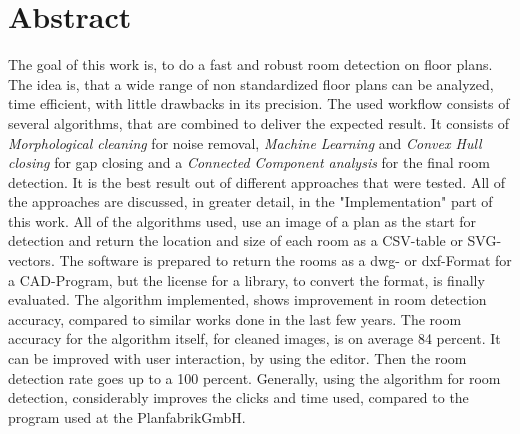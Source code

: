 \section{Abstract}
The goal of this work is, to do a fast and robust room detection on floor plans. The idea is, that a wide range of non standardized floor plans can be analyzed, time efficient, with little drawbacks in its precision.
The used workflow consists of several algorithms, that are combined to deliver the expected result. It consists of \textit{Morphological cleaning} for noise removal, \textit{Machine Learning} and \textit{Convex Hull closing} for gap closing and a \textit{Connected Component analysis} for the final room detection. It is the best result out of different approaches that were tested. All of the approaches are discussed, in greater detail, in the "Implementation" part of this work. All of the algorithms used, use an image of a plan  as the start for detection and return the location and size of each room as a CSV-table or SVG-vectors. The software is prepared to return the rooms as a dwg- or dxf-Format for a CAD-Program, but the license for a library, to convert the format, is finally evaluated.
The algorithm implemented, shows improvement in room detection accuracy, compared to similar works done in the last few years. The room accuracy for the algorithm itself, for cleaned images, is on average 84 percent. It can be improved with user interaction, by using the editor. Then the room detection rate goes up to a 100 percent. Generally, using the algorithm for room detection, considerably improves the clicks and time used, compared to the program used at the PlanfabrikGmbH.